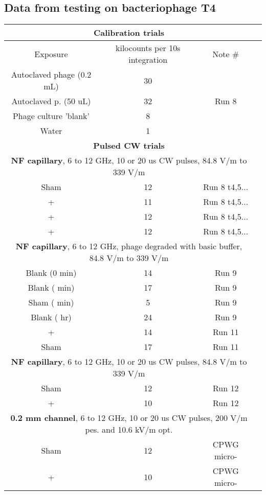 \documentclass[paper.tex]{subfiles}
\begin{document}
\subsection{Data from testing on bacteriophage T4}

\begin{table}[h!]
	\centering
	\begin{tabular}{ |c|c|c|c| } 
				\hline
		\multicolumn{3}{|c|}{\textbf{Calibration trials} } \\
		\hline
		\hline
		Exposure & kilocounts per 10s integration & Note \# \\
		\hline
		Autoclaved phage (0.2 mL) & 30 & \\ 
		Autoclaved p. (50 uL) & 32 & Run 8\\ 
		\hline
		Phage culture 'blank' & 8 & \\ 
		Water & 1 & \\

		\hline
\multicolumn{3}{|c|}{\textbf{Pulsed CW trials}} \\
\hline


		\hline
		\multicolumn{3}{|c|}{\textbf{NF capillary}, 6 to 12 GHz, 10 or 20 us CW pulses, 84.8 V/m to 339 V/m} \\
		\hline
		Sham   & 12 & Run 8 t4,5...\\
		+ & 11 & Run 8 t4,5...\\
		+  & 12 & Run 8 t4,5...\\
		+  & 12 & Run 8 t4,5...\\
		\hline
		\multicolumn{3}{|c|}{\textbf{NF capillary}, 6 to 12 GHz, phage degraded with basic buffer, 84.8 V/m to 339 V/m} \\
		\hline
		Blank (0 min) & 14 & Run 9 \\
		Blank (\ntilde 15 min) & 17 & Run 9\\
		Sham (\ntilde 15 min) & 5 & Run 9\\
		Blank (\ntilde 4 hr) & 24 & Run 9\\
		\hline
		+  & 14 & Run 11\\
		Sham & 17 & Run 11\\
		\hline
		\multicolumn{3}{|c|}{\textbf{NF capillary}, 6 to 12 GHz, 10 or 20 us CW pulses, 84.8 V/m to 339 V/m} \\
		\hline
		Sham & 12 & Run 12\\
		+    & 10 & Run 12\\
		\hline
		\multicolumn{3}{|c|}{\textbf{0.2 mm channel}, 6 to 12 GHz, 10 or 20 us CW pulses, 200 V/m pes. and 10.6 kV/m opt.} \\
		\hline
		 Sham & 12 & CPWG micro-\\
 		 +    & 10 & CPWG micro-\\


\end{tabular}
\end{table}
\end{document}
